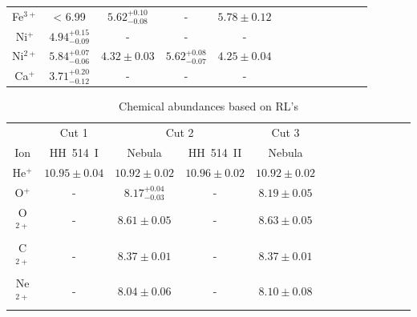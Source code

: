 \documentclass[fleqn,usenatbib]{mnras}
\begin{document}
\begin{table}
\begin{tabular}{ccccccccccccc}
Fe$^{3+}$ & < 6.99 &$5.62^{+0.10} _{-0.08}$& -&$5.78 \pm 0.12 $\\

Ni$^{+}$ & $4.94^{+0.15} _{-0.09}$ & - &-&-\\

Ni$^{2+}$ &$5.84^{+0.07} _{-0.06}$ & $4.32 \pm 0.03 $ &$5.62^{+0.08} _{-0.07}$&$4.25 \pm 0.04 $\\

Ca$^{+}$ & $3.71^{+0.20} _{-0.12}$ &- &-&-\\

\hline
\end{tabular}
\end{table}














\begin{table}
\centering
\caption{Chemical abundances based on RL's}
\label{tab:rls_abundances}
\begin{tabular}{ccccccccccccc}
\hline
 & \multicolumn{1}{c}{Cut 1} & \multicolumn{2}{c}{Cut 2} & \multicolumn{1}{c}{Cut 3} & \\
Ion &  HH~514~I & Nebula & HH~514~II  & Nebula \\
\hline

He$^{+}$  &$10.95 \pm 0.04$  & $10.92 \pm 0.02$& $10.96 \pm 0.02$&$10.92 \pm 0.02$\\

O$^{+}$ & - & $8.17^{+0.04} _{-0.03}$& -& $8.19 \pm 0.05 $ \\

O$^{2+}$ & - & $8.61 \pm 0.05$ & - & $8.63 \pm 0.05$  \\

C$^{2+}$  & -& $8.37 \pm 0.01 $ &-&  $8.37 \pm 0.01$ \\

Ne$^{2+}$ & -&$8.04 \pm 0.06 $&-& $8.10 \pm 0.08 $ \\
 
\hline
\end{tabular}
\end{table}
\end{document}
